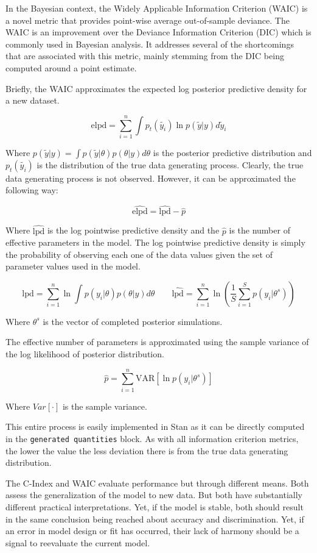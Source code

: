 In the Bayesian context, the Widely Applicable Information Criterion (WAIC) is a novel metric that provides point-wise average out-of-sample deviance\cite{Watanabe2010}. The WAIC is an improvement over the Deviance Information Criterion (DIC) which is commonly used in Bayesian analysis. It addresses several of the shortcomings that are associated with this metric, mainly stemming from the DIC being computed around a point estimate. 

Briefly, the WAIC approximates the expected log posterior predictive density for a new dataset\cite{Vehtari2015}. 

$$ \text{elpd} = \sum_{i=1}^n \int p_t(\tilde{y_i})\ln p(\tilde{y}|y) d\tilde{y}_i $$

Where $p(\tilde{y}|y) = \int p(\tilde{y}|\theta)p(\theta|y) d\theta$ is the posterior predictive distribution and $p_t(\tilde{y_i})$ is the distribution of the true data generating process. Clearly, the true data generating process is not observed. However, it can be approximated the following way:

$$\hat{\text{elpd}} = \hat{\text{lpd}} - \hat{p}$$

Where $\hat{\text{lpd}}$ is the log pointwise predictive density and the $\hat{p}$ is the number of effective parameters in the model. The log pointwise predictive density is simply the probability of observing each one of the data values given the set of parameter values used in the model.

$$ \text{lpd} = \sum_{i=1}^n \ln \int p(y_i|\theta)p(\theta|y) d\theta \qquad \hat{\text{lpd}} = \sum_{i=1}^n \ln\left ( \frac{1}{S} \sum_{i = 1}^S p(y_i|\theta^s)  \right ) $$

Where $\theta^s$ is the vector of completed posterior simulations. 

The effective number of parameters is approximated using the sample variance of the log likelihood of posterior distribution.

$$ \hat{p} = \sum^n_{i=1} \text{VAR}[\ln p(y_i|\theta^s)] $$

Where $Var[\cdot]$ is the sample variance.

This entire process is easily implemented in Stan as it can be directly computed in the \lstinline{generated quantities} block\cite{Vehtari2014}. As with all information criterion metrics, the lower the value the less deviation there is from the true data generating distribution. 

The C-Index and WAIC evaluate performance but through different means. Both assess the generalization of the model to new data. But both have substantially different practical interpretations. Yet, if the model is stable, both should result in the same conclusion being reached about accuracy and discrimination. Yet, if an error in model design or fit has occurred, their lack of harmony should be a signal to reevaluate the current model. 




